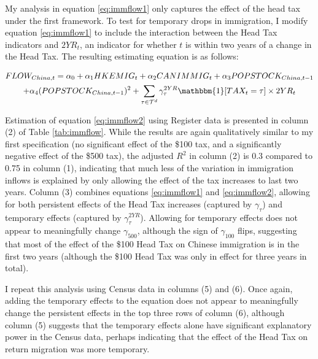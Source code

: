 My analysis in equation \eqref{eq:immflow1} only captures the effect of the head tax under the first framework. To test for temporary drops in immigration, I modify equation \eqref{eq:immflow1} to include the interaction between the Head Tax indicators and $2YR_t$, an indicator for whether $t$ is within two years of a change in the Head Tax. The resulting estimating equation is as follows: 

\begin{multline}
    \label{eq:immflow2}
    FLOW_{China,t} = \alpha_0 + \alpha_1 HKEMIG_t + \alpha_2 CANIMMIG_t + \alpha_3 POPSTOCK_{China, t-1} \\ + \alpha_4 (POPSTOCK_{China, t-1})^2 + \sum_{\tau \in \mathcal{T}^d} \gamma^{2YR}_\tau \mathbbm{1}[TAX_t = \tau]\times 2YR_t
\end{multline}

Estimation of equation \eqref{eq:immflow2} using Register data is presented in column (2) of Table \ref{tab:immflow}. While the results are again qualitatively similar to my first specification (no significant effect of the \$100 tax, and a significantly negative effect of the \$500 tax), the adjusted $R^2$ in column (2) is 0.3 compared to 0.75 in column (1), indicating that much less of the variation in immigration inflows is explained by only allowing the effect of the tax increases to last two years. Column (3) combines equations \eqref{eq:immflow1} and \eqref{eq:immflow2}, allowing for both persistent effects of the Head Tax increases (captured by $\gamma_{\tau}$) and temporary effects (captured by $\gamma_{\tau}^{2YR}$). 
Allowing for temporary effects does not appear to meaningfully change $\gamma_{500}$, although the sign of $\gamma_{100}$ flips, suggesting that most of the effect of the \$100 Head Tax on Chinese immigration is in the first two years (although the \$100 Head Tax was only in effect for three years in total).

I repeat this analysis using Census data in columns (5) and (6). Once again, adding the temporary effects to the equation does not appear to meaningfully change the persistent effects in the top three rows of column (6), although column (5) suggests that the temporary effects alone have significant explanatory power in the Census data, perhaps indicating that the effect of the Head Tax on return migration was more temporary.

